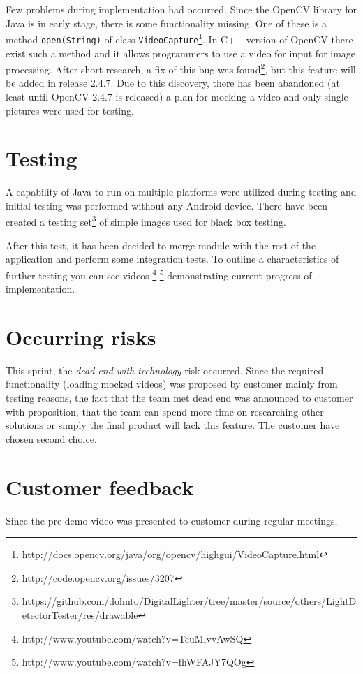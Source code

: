 Few problems during implementation had occurred. 
Since the OpenCV library for Java is in early stage, there is some functionality missing.
One of these is a method \texttt{open(String)} of class \texttt{VideoCapture}\footnote{http://docs.opencv.org/java/org/opencv/highgui/VideoCapture.html}.
In C++ version of OpenCV there exist such a method and it allows programmers to use a video for input for image processing.
After short research, a fix of this bug was found\footnote{http://code.opencv.org/issues/3207}, but this feature will be added in release 2.4.7.
Due to this discovery, there has been abandoned (at least until OpenCV 2.4.7 is released) a plan for mocking a video and only single pictures were used for testing.


\section{Testing}
A capability of Java to run on multiple platforms were utilized during testing and initial testing was performed without any Android device.
There have been created a testing set\footnote{https://github.com/dohnto/DigitalLighter/tree/master/source/others/LightDetectorTester/res/drawable} of simple images used for black box testing.

After this test, it has been decided to merge module with the rest of the application and perform some integration tests.
To outline a characteristics of further testing you can see videos \footnote{http://www.youtube.com/watch?v=TcuMlvvAwSQ} \footnote{http://www.youtube.com/watch?v=fhWFAJY7QOg} demonstrating current progress of implementation.

\section{Occurring risks}
This sprint, the \emph{dead end with technology} risk occurred. 
Since the required functionality (loading mocked videos) was proposed by customer mainly from testing reasons, the fact that the team met dead end was announced to customer with proposition, that the team can spend more time on researching other solutions or simply the final product will lack this feature.
The customer have chosen second choice.

\section{Customer feedback}
Since the pre-demo video was presented to customer during regular meetings, 

